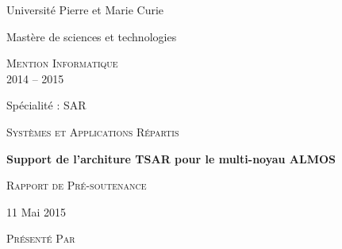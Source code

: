 \begin{titlepage}  

  {\begin{center}\huge\textsf{Université Pierre et Marie Curie}\end{center}}


  \vspace{0.4cm}
  

  {\begin{center}\huge\textsf{Mastère de sciences et technologies}\end{center}}
  
  \vspace{0.4cm}
  
  {\begin{center}\huge\textsc{Mention Informatique \\2014 -- 2015} \end{center}}
  
  \vspace{0.4cm}
  
  {\begin{center}\huge\textsf{Spécialité : SAR}\end{center}}
  
  {\begin{center}\large\textsc{Systèmes et Applications Répartis }\end{center}}
  
  \vspace{0.4cm}

  {\begin{center}\Huge\textbf{Support de l'architure TSAR pour le multi-noyau
        ALMOS}\end{center}}
  
  \vspace{0.4cm}
  
  {\begin{center}\huge\textsc{Rapport de Pré-soutenance}\end{center}}
  
  \vspace{0.4cm}
  
  {\begin{center}\large\textsf {11 Mai 2015 }\end{center}}
  
  \vspace{0.4cm}
  
  {\begin{center}\Large\textsc{Présenté Par}\end{center}}
  

\end{titlepage}
